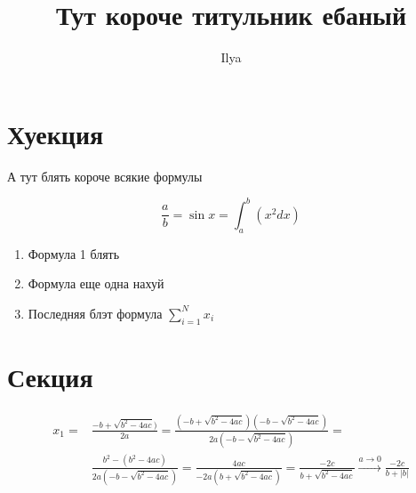 \documentclass[12pt]{article}
\title{Тут короче титульник ебаный}
\author{Ilya}
\begin{document}
\maketitle

\begin{abstract}

\end{abstract}

\section{Хуекция}

А тут блять короче всякие формулы 

\[\frac{a}{b} = \sin{x} = \int_a^b(x^2dx)\]

\begin{enumerate}
	\item Формула 1 блять
	\item Формула еще одна нахуй
	\item Последняя блэт формула $\sum_{i=1}^{N}x_i$
\end{enumerate}

\section{Секция}
\begin{align*}
    x_{1} = &\frac{-b + \sqrt{b^2-4ac})} {2a} = 
\frac{(-b + \sqrt{b^2-4ac})(-b - \sqrt{b^2-4ac})} {2a(-b - \sqrt{b^2-4ac})} = \\
&\frac{b^2 - (b^2-4ac)} {2a(-b - \sqrt{b^2-4ac})} =  \frac{4ac} {-2a(b + \sqrt{b^2-4ac})} = 
\frac{-2c} {b+\sqrt{b^2-4ac}} \xrightarrow{a\to0}
\frac{-2c} {b + |b|}
\end{align*}
\end{document}
